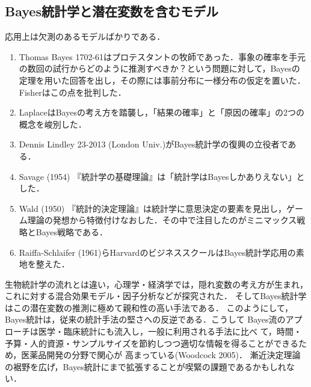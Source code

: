 \documentclass[uplatex,dvipdfmx]{jsreport}
\begin{document}
\subsection{Bayes統計学と潜在変数を含むモデル}

\begin{tcolorbox}[colframe=ForestGreen, colback=ForestGreen!10!white,breakable,colbacktitle=ForestGreen!40!white,coltitle=black,fonttitle=\bfseries\sffamily,
title=]
    応用上は欠測のあるモデルばかりである．
\end{tcolorbox}

\begin{remarks}[Bayes統計学の歴史]\mbox{}
    \begin{enumerate}
        \item Thomas Bayes 1702-61はプロテスタントの牧師であった．事象の確率を手元の数回の試行からどのように推測すべきか？という問題に対して，Bayesの定理を用いた回答を出し，その際には事前分布に一様分布の仮定を置いた．Fisherはこの点を批判した．
        \item LaplaceはBayesの考え方を踏襲し，「結果の確率」と「原因の確率」の2つの概念を峻別した．
        \item Dennis Lindley 23-2013 (London Univ.)がBayes統計学の復興の立役者である．
        \item Savage (1954) 『統計学の基礎理論』は「統計学はBayesしかありえない」とした．
        \item Wald (1950) 『統計的決定理論』は統計学に意思決定の要素を見出し，ゲーム理論の発想から特徴付けなおした．その中で注目したのがミニマックス戦略とBayes戦略である．
        \item Raiffa-Schlaifer (1961)らHarvardのビジネススクールはBayes統計学応用の素地を整えた．
    \end{enumerate}
\end{remarks}

\begin{remarks}[Bayes統計学への要請]
    生物統計学の流れとは違い，心理学・経済学では，隠れ変数の考え方が生まれ，これに対する混合効果モデル・因子分析などが探究された．
    そしてBayes統計学はこの潜在変数の推測に極めて親和性の高い手法である．
    このようにして，Bayes統計は，従来の統計手法の堅さへの反逆である．こうして
    Bayes流のアプローチは医学・臨床統計にも流入し，一般に利用される手法に比べ
    て，時間・予算・人的資源・サンプルサイズを節約しつつ適切な情報を得ることができるため，医薬品開発の分野で関心が
    高まっている(Woodcock 2005)．
    漸近決定理論の裾野を広げ，Bayes統計にまで拡張することが喫緊の課題であるかもしれない．
\end{remarks}
\end{document}
